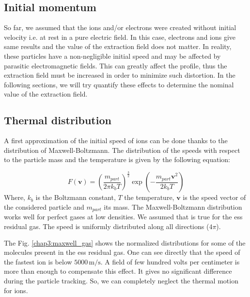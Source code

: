 \begin{refsection}
  \section{Initial momentum}
  So far, we assumed that the ions and/or electrons were created without initial velocity i.e. at rest in a pure electric field. In this case, electrons and ions give same results and the value of the extraction field does not matter. In reality, these particles have a non-negligible initial speed and may be affected by parasitic electromagnetic fields. This can greatly affect the profile, thus the extraction field must be increased in order to minimize such distortion. In the following sections, we will try quantify these effects to determine the nominal value of the extraction field.

  \subsection{Thermal distribution}
  A first approximation of the initial speed of ions can be done thanks to the distribution of Maxwell-Boltzmann. The distribution of the speeds with respect to the particle mass and the temperature is given by the following equation:

  \begin{equation}
    F(\boldsymbol{v}) = \left(\frac{m_{part}}{2 \pi k_{b} T}\right)^{\frac{3}{2}}\exp\left(-\frac{m_{part}\boldsymbol{v}^{2}}{2 k_{b} T}\right)
  \end{equation}
  Where, $k_{b}$ is the Boltzmann constant, $T$ the temperature, $\boldsymbol{v}$ is the speed vector of the considered particle and $m_{part}$ its mass. The Maxwell-Boltzmann distribution works well for perfect gases at low densities. We assumed that is true for the \acrshort{ess} residual gas. The speed is uniformly distributed along all directions ($4\pi$).

  The Fig. \ref{chap3:maxwell_gas} shows the normalized distributions for some of the molecules present in the \acrshort{ess} residual gas. One can see directly that the speed of the fastest ion is below $5000\,\mathrm{m/s}$. A field of few hundred volts per centimeter is more than enough to compensate this effect. It gives no significant difference during the particle tracking. So, we can completely neglect the thermal motion for ions.
  



\end{refsection}
